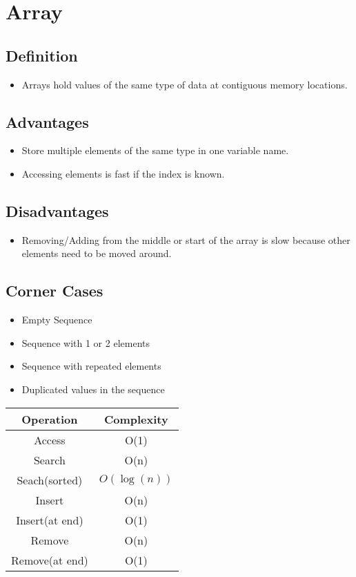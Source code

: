 \chapter{Array}

\section{Definition}
\begin{itemize}
	\item Arrays hold values of the same type of data at contiguous memory locations.
\end{itemize}

\section{Advantages}
\begin{itemize}
	\item Store multiple elements of the same type in one variable name.
	\item Accessing elements is fast if the index is known.
\end{itemize}

\section{Disadvantages}
\begin{itemize}
	\item Removing/Adding from the middle or start of the array is slow because other elements need to be moved around.
\end{itemize}

\section{Corner Cases}
\begin{itemize}
	\item Empty Sequence
	\item Sequence with 1 or 2 elements
	\item Sequence with repeated elements
	\item Duplicated values in the sequence
\end{itemize}

\begin{center}
\begin{tabular}{||c c||} 
 \hline
 Operation & Complexity\\ [0.5ex] 
 \hline\hline
 Access & O(1) \\ 
 \hline
 Search & O(n) \\
 \hline
 Seach(sorted) & \[O(\log(n))\] \\
 \hline
 Insert & O(n) \\
 \hline
 Insert(at end) & O(1)\\ [1ex] 
 \hline
 Remove & O(n) \\ [1ex] 
 \hline
 Remove(at end) & O(1) \\ [1ex] 
 \hline

\end{tabular}
\end{center}